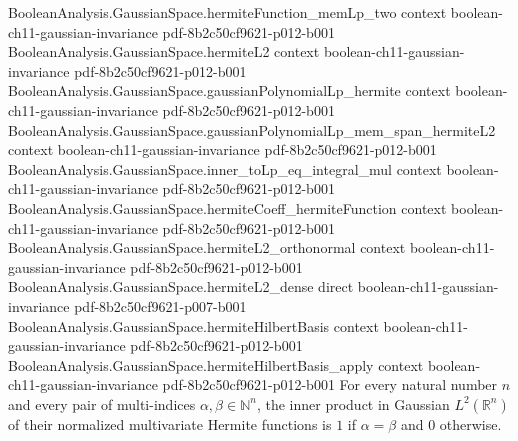 \begin{lemma}
  {BooleanAnalysis.GaussianSpace.hermiteFunction_memLp_two}
  {context}
  {boolean-ch11-gaussian-invariance}
  {pdf-8b2c50cf9621-p012-b001}
\proofstep
  {BooleanAnalysis.GaussianSpace.hermiteL2}
  {context}
  {boolean-ch11-gaussian-invariance}
  {pdf-8b2c50cf9621-p012-b001}
\proofstep
  {BooleanAnalysis.GaussianSpace.gaussianPolynomialLp_hermite}
  {context}
  {boolean-ch11-gaussian-invariance}
  {pdf-8b2c50cf9621-p012-b001}
\proofstep
  {BooleanAnalysis.GaussianSpace.gaussianPolynomialLp_mem_span_hermiteL2}
  {context}
  {boolean-ch11-gaussian-invariance}
  {pdf-8b2c50cf9621-p012-b001}
\proofstep
  {BooleanAnalysis.GaussianSpace.inner_toLp_eq_integral_mul}
  {context}
  {boolean-ch11-gaussian-invariance}
  {pdf-8b2c50cf9621-p012-b001}
\proofstep
  {BooleanAnalysis.GaussianSpace.hermiteCoeff_hermiteFunction}
  {context}
  {boolean-ch11-gaussian-invariance}
  {pdf-8b2c50cf9621-p012-b001}
\proofstep
  {BooleanAnalysis.GaussianSpace.hermiteL2_orthonormal}
  {context}
  {boolean-ch11-gaussian-invariance}
  {pdf-8b2c50cf9621-p012-b001}
\proofstep
  {BooleanAnalysis.GaussianSpace.hermiteL2_dense}
  {direct}
  {boolean-ch11-gaussian-invariance}
  {pdf-8b2c50cf9621-p007-b001}
\proofstep
  {BooleanAnalysis.GaussianSpace.hermiteHilbertBasis}
  {context}
  {boolean-ch11-gaussian-invariance}
  {pdf-8b2c50cf9621-p012-b001}
\proofstep
  {BooleanAnalysis.GaussianSpace.hermiteHilbertBasis_apply}
  {context}
  {boolean-ch11-gaussian-invariance}
  {pdf-8b2c50cf9621-p012-b001}
For every natural number $n$ and every pair of multi-indices $\alpha,\beta\in\mathbb
N^n$, the inner product in Gaussian $L^2(\mathbb R^n)$ of their normalized multivariate
Hermite functions is $1$ if $\alpha=\beta$ and $0$ otherwise.
\end{lemma}

